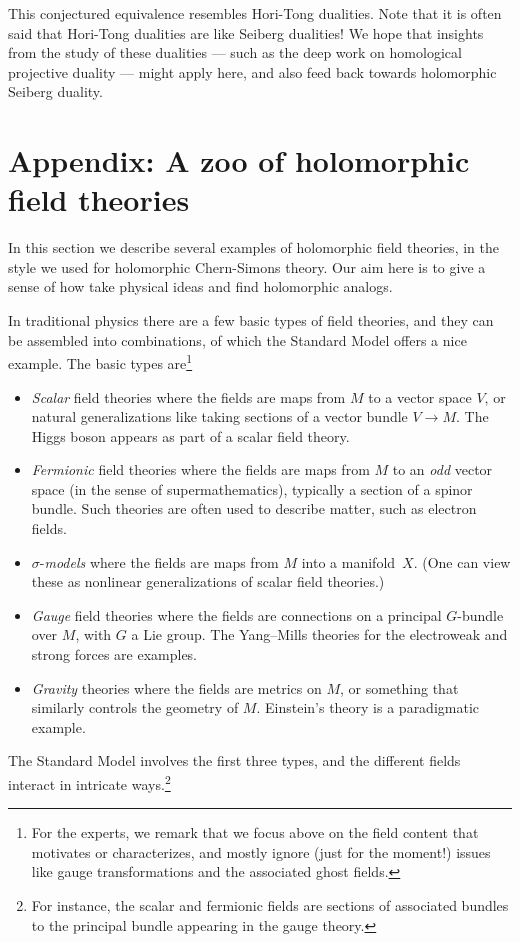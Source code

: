 \documentclass[11pt]{amsart}
\begin{document}

This conjectured equivalence resembles Hori-Tong dualities.
Note that it is often said that Hori-Tong dualities are like Seiberg dualities!
We hope that insights from the study of these dualities --- such as the deep work on homological projective duality \cite{KuzHPD, ThomasHPD, Perry} --- might apply here, and also feed back towards holomorphic Seiberg duality.


\section*{Appendix: A zoo of holomorphic field theories}
\label{sec: ex of theories}

In this section we describe several examples of holomorphic field theories,
in the style we used for holomorphic Chern-Simons theory.
Our aim here is to give a sense of how take physical ideas and find holomorphic analogs.

In traditional physics there are a few basic types of field theories, 
and they can be assembled into combinations,
of which the Standard Model offers a nice example.
The basic types are\footnote{For the experts, we remark that we focus above on the field content that motivates or characterizes, and mostly ignore (just for the moment!) issues like gauge transformations and the associated ghost fields.}
\begin{itemize}
\item {\em Scalar} field theories where the fields are maps from $M$ to a vector space $V$, or natural generalizations like taking sections of a vector bundle $V \to M$. The Higgs boson appears as part of a scalar field theory.
\item {\em Fermionic} field theories where the fields are maps from $M$ to an {\em odd} vector space (in the sense of supermathematics), typically a section of a spinor bundle. Such theories are often used to describe matter, such as electron fields.
\item $\sigma$-{\em models} where the fields are maps from $M$ into a manifold~$X$. (One can view these as nonlinear generalizations of scalar field theories.)
\item {\em Gauge} field theories where the fields are connections on a principal $G$-bundle over $M$, with $G$ a Lie group. The Yang--Mills theories for the electroweak and strong forces are examples.
\item {\em Gravity} theories where the fields are metrics on $M$, or something that similarly controls the geometry of $M$. Einstein's theory is a paradigmatic example.
\end{itemize}
The Standard Model involves the first three types,
and the different fields interact in intricate ways.\footnote{For instance, the scalar and fermionic fields are sections of associated bundles to the principal bundle appearing in the gauge theory.}
\end{document}
